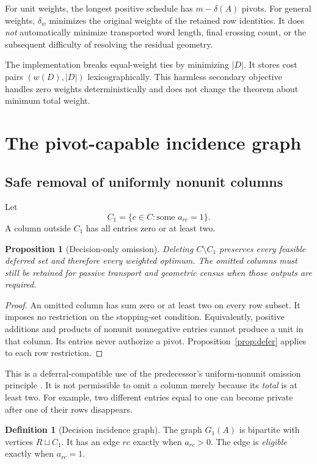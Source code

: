 \documentclass[11pt]{article}
\newtheorem{proposition}[theorem]{Proposition}
\theoremstyle{definition}\newtheorem{definition}[theorem]{Definition}
\theoremstyle{remark}\newtheorem{remark}[theorem]{Remark}
\begin{document}
For unit weights, the longest positive schedule has $m-\delta(A)$ pivots. For general weights, $\delta_w$ minimizes the original weights of the retained row identities. It does \emph{not} automatically minimize transported word length, final crossing count, or the subsequent difficulty of resolving the residual geometry.

The implementation breaks equal-weight ties by minimizing $|D|$. It stores cost pairs $(w(D),|D|)$ lexicographically. This harmless secondary objective handles zero weights deterministically and does not change the theorem about minimum total weight.

\section{The pivot-capable incidence graph}
\label{sec:graph}

\subsection{Safe removal of uniformly nonunit columns}
Let
\[
 C_1=\{c\in C:\text{some }a_{rc}=1\}.
\]
A column outside $C_1$ has all entries zero or at least two.

\begin{proposition}[Decision-only omission]
\label{prop:omission}
Deleting $C\setminus C_1$ preserves every feasible deferred set and therefore every weighted optimum. The omitted columns must still be retained for passive transport and geometric census when those outputs are required.
\end{proposition}
\begin{proof}
An omitted column has sum zero or at least two on every row subset. It imposes no restriction on the stopping-set condition. Equivalently, positive additions and products of nonunit nonnegative entries cannot produce a unit in that column. Its entries never authorize a pivot. Proposition~\ref{prop:defer} applies to each row restriction.
\end{proof}

This is a deferral-compatible use of the predecessor's uniform-nonunit omission principle \cite{positive}. It is not permissible to omit a column merely because its \emph{total} is at least two. For example, two different entries equal to one can become private after one of their rows disappears.

\begin{definition}[Decision incidence graph]
The graph $G_1(A)$ is bipartite with vertices $R\sqcup C_1$. It has an edge $rc$ exactly when $a_{rc}>0$. The edge is \emph{eligible} exactly when $a_{rc}=1$.
\end{definition}
\end{document}
